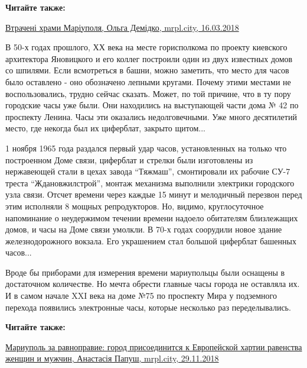 \textbf{Читайте также:} 

\href{https://mrpl.city/blogs/view/vtracheni-hrami-mariupolya}{%
Втрачені храми Маріуполя, Ольга Демідко, mrpl.city, 16.03.2018}

В 50-х годах прошлого, ХХ века на месте горисполкома по проекту киевского
архитектора Яновицкого и его коллег построили один из двух известных домов со
шпилями. Если всмотреться в башни, можно заметить, что место для часов было
оставлено - оно обозначено лепными кругами. Почему этими местами не
воспользовались, трудно сейчас сказать. Может, по той причине, что в ту пору
городские часы уже были. Они находились на выступающей части дома № 42 по
проспекту Ленина. Часы эти оказались недолговечными. Уже много десятилетий
место, где некогда был их циферблат, закрыто щитом...


1 ноября 1965 года раздался первый удар часов, установленных на только что
построенном Доме связи, циферблат и стрелки были изготовлены из нержавеющей
стали в цехах завода \enquote{Тяжмаш}, смонтировали их рабочие СУ-7 треста
\enquote{Ждановжилстрой}, монтаж механизма выполнили электрики городского узла
связи.  Отсчет времени через каждые 15 минут и мелодичный перезвон перед этим
исполняли 8 мощных репродукторов. Но, видимо, круглосуточное напоминание о
неудержимом течении времени надоело обитателям близлежащих домов, и часы на
Доме связи умолкли. В 70-х годах соорудили новое здание железнодорожного
вокзала. Его украшением стал большой циферблат башенных часов...


Вроде бы приборами для измерения времени мариупольцы были оснащены в
достаточном количестве. Но мечта обрести главные часы города не оставляла их. И
в самом начале XXI века на доме №75 по проспекту Мира у подземного перехода
появились электронные часы, которые несколько раз переделывались.

\textbf{Читайте также:} 

\href{https://mrpl.city/news/view/mariupol-za-ravnopravie-gorod-prisoedinitsya-k-evropejskoj-hartii-ravenstva-zhenshhin-i-muzhchin}{%
Мариуполь за равноправие: город присоединится к Европейской хартии равенства женщин и мужчин, Анастасія Папуш, mrpl.city, 29.11.2018}


